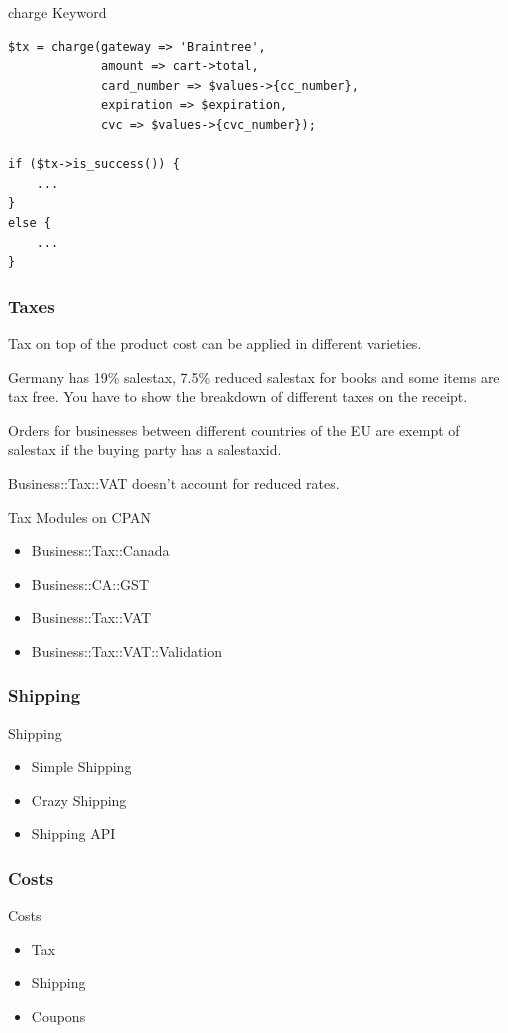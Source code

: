 \begin{frame}[fragile]{charge Keyword}
\begin{lstlisting}
$tx = charge(gateway => 'Braintree',
             amount => cart->total,
             card_number => $values->{cc_number},
             expiration => $expiration,
             cvc => $values->{cvc_number});

if ($tx->is_success()) {
    ...
}
else {
    ...
}
\end{lstlisting}
\end{frame}

\subsubsection{Taxes}
Tax on top of the product cost can be applied in different varieties.

Germany has 19\% salestax, 7.5\% reduced salestax for books and some
items are tax free. You have to show the breakdown of different taxes
on the receipt.

Orders for businesses between different countries of the EU are exempt
of salestax if the buying party has a salestaxid.

Business::Tax::VAT doesn't account for reduced rates.

\begin{frame}{Tax Modules on CPAN}
\begin{itemize}
\item Business::Tax::Canada
\item Business::CA::GST
\item Business::Tax::VAT
\item Business::Tax::VAT::Validation
\end{itemize}
\end{frame}

\subsubsection{Shipping}
\begin{frame}{Shipping}
\begin{itemize}
\item Simple Shipping
\item Crazy Shipping
\item Shipping API
\end{itemize}
\end{frame}

\subsubsection{Costs}
\begin{frame}{Costs}
\begin{itemize}
\item Tax
\item Shipping
\item Coupons
\end{itemize}
\end{frame}

